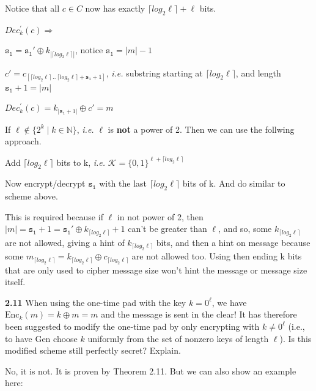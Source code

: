 \begin{enumerate}
	Notice that all $c \in C$ now has exactly $\lceil log_2 \ell \rceil + \ell$ bits.
	
	$Dec^{'}_k(c) \Rightarrow$
	
	$\mathtt{s_1} =  \mathtt{s_1}'  \oplus k_{|\lceil log_2 \ell \rceil|}$, notice $\mathtt{s_1} = |m| - 1$
	
    $c' = c_{[\lceil log_2 \ell \rceil \,..\,\lceil log_2 \ell \rceil + \mathtt{s_1}+1]}$, \textit{i.e.} substring starting at $\lceil log_2 \ell \rceil$, and length $\mathtt{s_1} + 1 = |m|$
	
	$Dec^{'}_k(c) = k_{|\mathtt{s_1} + 1|} \oplus c' = m$
	
	If $\ell \notin \{2^k \mid k \in \mathbb{N}\}$, \textit{i.e.} $\ell$ is \textbf{not} a power of 2. Then we can use the follwing approach.
	
	Add $\lceil log_2 \ell \rceil$ bits to k, \textit{i.e.} $\mathcal{K} = \{0,1\}^{\ell + \lceil log_2 \ell \rceil}$
	
	Now encrypt/decrypt $\mathtt{s_1}$ with the last $\lceil log_2 \ell \rceil$ bits of k. And do similar to scheme above.
	
	This is required because if $\ell$ in not power of 2, then $|m| = \mathtt{s_1} + 1 = \mathtt{s_1}' \oplus k_{\lceil log_2 \ell \rceil} + 1$ can't be greater than $\ell$, and so, some $ k_{\lceil log_2 \ell \rceil}$ are not allowed, giving a hint of $ k_{\lceil log_2 \ell \rceil}$ bits, and then a hint on message because some $m_{\lceil log_2 \ell \rceil} = k_{\lceil log_2 \ell \rceil} \oplus c_{\lceil log_2 \ell \rceil}$ are not allowed too. Using then ending k bits that are only used to cipher message size won't hint the message or message size itself.
	
\end{enumerate}

\vspace{1em}
\noindent
\textbf{2.11} \hspace{1em} When using the one-time pad with the key $k = 0^\ell$, we have $\text{Enc}_k(m) = k \oplus m = m$ and the message is sent in the clear! It has therefore been suggested to modify the one-time pad by only encrypting with $k \ne 0^\ell$ (i.e., to have $\text{Gen}$ choose $k$ uniformly from the set of nonzero keys of length $\ell$). Is this modified scheme still perfectly secret? Explain.
\vspace{1em}

No, it is not. It is proven by Theorem 2.11. But we can also show an example here:

